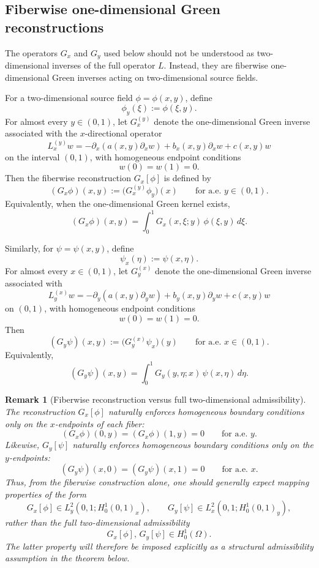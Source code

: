 \documentclass[11pt]{article}
\newtheorem{remark}{Remark}
\begin{document}
\subsection{Fiberwise one-dimensional Green reconstructions}
\label{subsec:fiberwise-green-reconstructions}

The operators \(G_x\) and \(G_y\) used below should not be understood as
two-dimensional inverses of the full operator \(L\).  Instead, they are
fiberwise one-dimensional Green inverses acting on two-dimensional source
fields.

For a two-dimensional source field \(\phi=\phi(x,y)\), define
\[
    \phi_y(\xi) := \phi(\xi,y).
\]
For almost every \(y\in(0,1)\), let \(G_x^{(y)}\) denote the
one-dimensional Green inverse associated with the \(x\)-directional
operator
\[
    L_x^{(y)} w
    =
    -\partial_x\!\left(a(x,y)\partial_x w\right)
    + b_x(x,y)\partial_x w
    + c(x,y)w
\]
on the interval \((0,1)\), with homogeneous endpoint conditions
\[
    w(0)=w(1)=0.
\]
Then the fiberwise reconstruction \(G_x[\phi]\) is defined by
\begin{equation}
    (G_x\phi)(x,y)
    :=
    \bigl(G_x^{(y)}\phi_y\bigr)(x)
    \qquad
    \text{for a.e. } y\in(0,1).
    \label{eq:Gx-fiberwise-definition}
\end{equation}
Equivalently, when the one-dimensional Green kernel exists,
\[
    (G_x\phi)(x,y)
    =
    \int_0^1 G_x(x,\xi;y)\,\phi(\xi,y)\,d\xi .
\]

Similarly, for \(\psi=\psi(x,y)\), define
\[
    \psi_x(\eta) := \psi(x,\eta).
\]
For almost every \(x\in(0,1)\), let \(G_y^{(x)}\) denote the
one-dimensional Green inverse associated with
\[
    L_y^{(x)} w
    =
    -\partial_y\!\left(a(x,y)\partial_y w\right)
    + b_y(x,y)\partial_y w
    + c(x,y)w
\]
on \((0,1)\), with homogeneous endpoint conditions
\[
    w(0)=w(1)=0.
\]
Then
\begin{equation}
    (G_y\psi)(x,y)
    :=
    \bigl(G_y^{(x)}\psi_x\bigr)(y)
    \qquad
    \text{for a.e. } x\in(0,1).
    \label{eq:Gy-fiberwise-definition}
\end{equation}
Equivalently,
\[
    (G_y\psi)(x,y)
    =
    \int_0^1 G_y(y,\eta;x)\,\psi(x,\eta)\,d\eta .
\]

\begin{remark}[Fiberwise reconstruction versus full two-dimensional admissibility]
The reconstruction \(G_x[\phi]\) naturally enforces homogeneous boundary
conditions only on the \(x\)-endpoints of each fiber:
\[
    (G_x\phi)(0,y)=(G_x\phi)(1,y)=0
    \qquad \text{for a.e. }y.
\]
Likewise, \(G_y[\psi]\) naturally enforces homogeneous boundary
conditions only on the \(y\)-endpoints:
\[
    (G_y\psi)(x,0)=(G_y\psi)(x,1)=0
    \qquad \text{for a.e. }x.
\]
Thus, from the fiberwise construction alone, one should generally expect
mapping properties of the form
\[
    G_x[\phi]\in L^2_y(0,1;H_0^1(0,1)_x),
    \qquad
    G_y[\psi]\in L^2_x(0,1;H_0^1(0,1)_y),
\]
rather than the full two-dimensional admissibility
\[
    G_x[\phi],\,G_y[\psi]\in H_0^1(\Omega).
\]
The latter property will therefore be imposed explicitly as a structural
admissibility assumption in the theorem below.
\end{remark}
\end{document}
